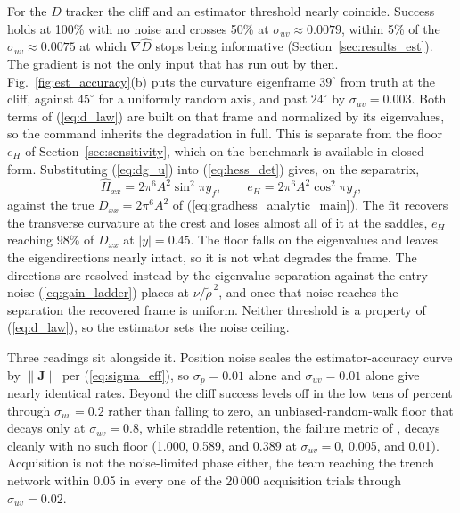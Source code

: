\documentclass[lettersize,journal]{IEEEtran}
\begin{document}
For the $D$ tracker the cliff and an estimator threshold nearly coincide.
Success holds at 100\% with no noise and crosses 50\% at $\sigma_{uv}
\approx 0.0079$, within 5\% of the $\sigma_{uv} \approx 0.0075$ at which
$\nabla\hat{D}$ stops being informative (Section~\ref{sec:results_est}).
The gradient is not the only input that has run out by then.
Fig.~\ref{fig:est_accuracy}(b) puts the curvature eigenframe $39^\circ$
from truth at the cliff, against $45^\circ$ for a uniformly random axis,
and past $24^\circ$ by $\sigma_{uv} = 0.003$. Both terms of
(\ref{eq:d_law}) are built on that frame and normalized by its
eigenvalues, so the command inherits the degradation in full. This is
separate from the floor $e_H$ of Section~\ref{sec:sensitivity}, which on
the benchmark is available in closed form. Substituting (\ref{eq:dg_u})
into (\ref{eq:hess_det}) gives, on the separatrix,
\begin{equation}
    \hat{H}_{xx} = 2\pi^6 A^2 \sin^2 \pi y_f,
    \qquad
    e_H = 2\pi^6 A^2 \cos^2 \pi y_f,
    \label{eq:floor_closed}
\end{equation}
against the true $D_{xx} = 2\pi^6 A^2$ of
(\ref{eq:gradhess_analytic_main}). The fit recovers the transverse
curvature at the crest and loses almost all of it at the saddles, $e_H$
reaching $98$\% of $D_{xx}$ at $|y| = 0.45$. The floor falls on the
eigenvalues and leaves the eigendirections nearly intact, so it is not
what degrades the frame. The directions are resolved instead by
the eigenvalue separation against the entry noise
(\ref{eq:gain_ladder}) places at $\nu/\tilde{\rho}^{\,2}$, and once that
noise reaches the separation the recovered frame is uniform. Neither
threshold is a property of (\ref{eq:d_law}), so the estimator sets the
noise ceiling.

Three readings sit alongside it. Position noise scales the
estimator-accuracy curve by $\|\mathbf{J}\|$ per (\ref{eq:sigma_eff}), so
$\sigma_p = 0.01$ alone and $\sigma_{uv} = 0.01$ alone give nearly
identical rates. Beyond the cliff success levels off in the low tens of
percent through $\sigma_{uv} = 0.2$ rather than falling to zero, an
unbiased-random-walk floor that decays only at $\sigma_{uv} = 0.8$, while
straddle retention, the failure metric of \cite{17}, decays cleanly with no
such floor (1.000, 0.589, and 0.389 at $\sigma_{uv} = 0$, 0.005, and 0.01).
Acquisition is not the noise-limited phase either, the team reaching the
trench network within 0.05 in every one of the 20\,000 acquisition trials
through $\sigma_{uv} = 0.02$.
\end{document}
